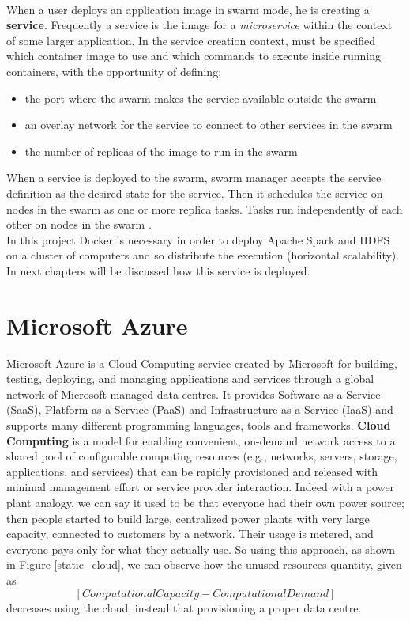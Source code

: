 \\[1\baselineskip]
When a user deploys an application image in swarm mode, he is creating a \textbf{service}. Frequently a service is the image for a \textit{microservice} within the context of some larger application.\newline
In the service creation context, must be specified which container image to use and which commands to execute inside running containers, with the opportunity of defining:
\begin{itemize}
	\item the port where the swarm makes the service available outside the swarm
	\item an overlay network for the service to connect to other services in the swarm
	\item the number of replicas of the image to run in the swarm
\end{itemize}
When a service is deployed to the swarm, swarm manager accepts the service definition as the desired state for the service. Then it schedules the service on nodes in the swarm as one or more replica tasks. Tasks run independently of each other on nodes in the swarm \cite{DockerSwarm}.
\\[1\baselineskip]
In this project Docker is necessary in order to deploy Apache Spark and HDFS on a cluster of computers and so distribute the execution (horizontal scalability). In next chapters will be discussed how this service is deployed.

\section{Microsoft Azure}
Microsoft Azure is a Cloud Computing service created by Microsoft for building, testing, deploying, and managing applications and services through a global network of Microsoft-managed data centres. It provides Software as a Service (SaaS), Platform as a Service (PaaS) and Infrastructure as a Service (IaaS) and supports many different programming languages, tools and frameworks.\newline
\textbf{Cloud Computing} is a model for enabling convenient, on-demand network access to a shared pool of configurable computing resources (e.g., networks, servers, storage, applications, and services) that can be rapidly provisioned and released with minimal management effort or service provider interaction. Indeed with a power plant analogy, we can say it used to be that everyone had their own power source; then people started to build large, centralized power plants with very large capacity, connected to customers by a network. Their usage is metered, and everyone pays only for what they actually use.\newline
So using this approach, as shown in Figure \ref{static_cloud}, we can observe how the unused resources quantity, given as \[[Computational Capacity - Computational Demand]\]
decreases using the cloud, instead that provisioning a proper data centre.


